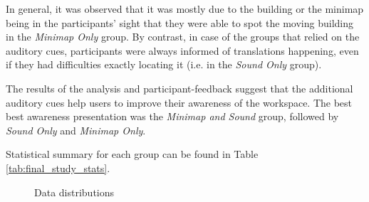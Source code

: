 In general, it was observed that it was mostly due to the building or the minimap being in the participants' sight that they were able to spot the moving building in the \textit{Minimap Only} group. By contrast, in case of the groups that relied on the auditory cues, participants were always informed of translations happening, even if they had difficulties exactly locating it (i.e. in the \textit{Sound Only} group).



The results of the analysis and participant-feedback suggest that the additional auditory cues help users to improve their awareness of the workspace. The best best awareness presentation was the \textit{Minimap and Sound} group, followed by \textit{Sound Only} and \textit{Minimap Only}.

Statistical summary for each group can be found in Table \ref{tab:final_study_stats}.

\begin{figure}
	\centering
	
	

	
	
	\par \smallskip
	
	\caption{Data distributions}
	\label{fig:histograms}
\end{figure}


